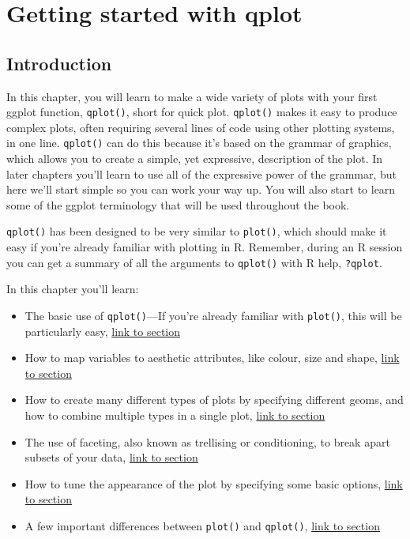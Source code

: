\chapter{Getting started with qplot}\label{cha:qplot}

\section{Introduction}

In this chapter, you will learn to make a wide variety of plots with
your first ggplot function, \texttt{qplot()}, short for quick plot.
\texttt{qplot()} makes it easy to produce complex plots, often requiring
several lines of code using other plotting systems, in one line.
\texttt{qplot()} can do this because it's based on the grammar of
graphics, which allows you to create a simple, yet expressive,
description of the plot. In later chapters you'll learn to use all of
the expressive power of the grammar, but here we'll start simple so you
can work your way up. You will also start to learn some of the ggplot
terminology that will be used throughout the book.

\texttt{qplot()} has been designed to be very similar to
\texttt{plot()}, which should make it easy if you're already familiar
with plotting in R. Remember, during an R session you can get a summary
of all the arguments to \texttt{qplot()} with R help, \texttt{?qplot}.

In this chapter you'll learn:

\begin{itemize}
\itemsep1pt\parskip0pt
\item
  The basic use of \texttt{qplot()}---If you're already familiar with
  \texttt{plot()}, this will be particularly easy,
  \hyperref[sec:basic-use]{link to section}
\item
  How to map variables to aesthetic attributes, like colour, size and
  shape, \hyperref[sec:aesthetic-attributes]{link to section}
\item
  How to create many different types of plots by specifying different
  geoms, and how to combine multiple types in a single plot,
  \hyperref[sec:plot-geoms]{link to section}
\item
  The use of faceting, also known as trellising or conditioning, to
  break apart subsets of your data, \hyperref[sec:qplot-faceting]{link
  to section}
\item
  How to tune the appearance of the plot by specifying some basic
  options, \hyperref[sec:other-options]{link to section}
\item
  A few important differences between \texttt{plot()} and
  \texttt{qplot()}, \hyperref[sec:plot-diffs]{link to section}
\end{itemize}

